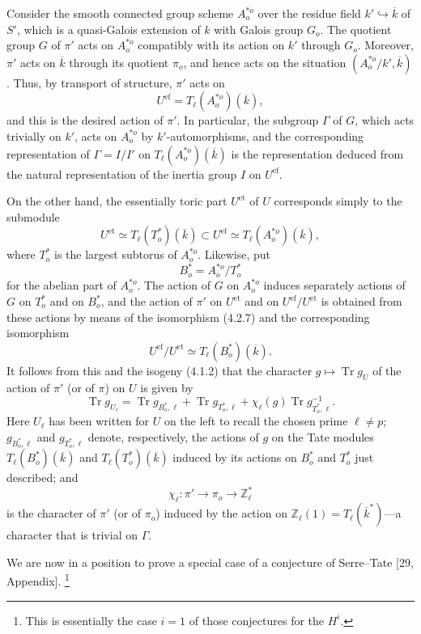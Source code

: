 Consider the smooth connected group scheme $A^{*o}_o$ over the residue
field $k'\hookrightarrow\overline k$ of $S'$, which is a quasi-Galois
extension of $k$ with Galois group $G_o$.  The quotient group $G$ of
$\pi'$ acts on $A^{*o}_o$ compatibly with its action on $k'$ through
$G_o$.  Moreover, $\pi'$ acts on $\overline k$ through its quotient
$\pi_o$, and hence acts on the situation
$(A^{*o}_o/k',\overline k)$.  Thus, by transport of structure, $\pi'$
acts on
\[
 U^{\mathrm{ef}}=T_\ell(A^{*o}_o)(\overline k),
\]
and this is the desired action of $\pi'$.  In particular, the subgroup
$\Gamma$ of $G$, which acts trivially on $k'$, acts on $A^{*o}_o$ by
$k'$-automorphisms, and the corresponding representation of
$\Gamma=I/I'$ on $T_\ell(A^{*o}_o)(\overline k)$ is the representation
deduced from the natural representation of the inertia group $I$ on
$U^{\mathrm{ef}}$.

On the other hand, the essentially toric part $U^{\mathrm{et}}$ of $U$
corresponds simply to the submodule
\begin{equation}\tag{4.2.7}
 U^{\mathrm{et}}\simeq T_\ell(T^*_o)(\overline k)
 \subset U^{\mathrm{ef}}\simeq T_\ell(A^{*o}_o)(\overline k),
\end{equation}
where $T^*_o$ is the largest subtorus of $A^{*o}_o$.  Likewise, put
\begin{equation}\tag{4.2.8}
 B^*_o=A^{*o}_o/T^*_o
\end{equation}
for the abelian part of $A^{*o}_o$.  The action of $G$ on $A^{*o}_o$
induces separately actions of $G$ on $T^*_o$ and on $B^*_o$, and the
action of $\pi'$ on $U^{\mathrm{et}}$ and on
$U^{\mathrm{ef}}/U^{\mathrm{et}}$ is obtained from these actions by
means of the isomorphism (4.2.7) and the corresponding isomorphism
\begin{equation}\tag{4.2.9}
 U^{\mathrm{ef}}/U^{\mathrm{et}}
 \simeq T_\ell(B^*_o)(\overline k).
\end{equation}
It follows from this and the isogeny (4.1.2) that the character
$g\longmapsto\operatorname{Tr}g_U$ of the action of $\pi'$ (or of
$\pi$) on $U$ is given by
\begin{equation}\tag{4.2.10}
 \operatorname{Tr}g_{U_\ell}
 =\operatorname{Tr}g_{B^*_o,\ell}
 +\operatorname{Tr}g_{T^*_o,\ell}
 +\chi_\ell(g)\operatorname{Tr}g^{-1}_{T^*_o,\ell}.
\end{equation}
Here $U_\ell$ has been written for $U$ on the left to recall the chosen
prime $\ell\ne p$; $g_{B^*_o,\ell}$ and $g_{T^*_o,\ell}$ denote,
respectively, the actions of $g$ on the Tate modules
$T_\ell(B^*_o)(\overline k)$ and $T_\ell(T^*_o)(\overline k)$ induced by
its actions on $B^*_o$ and $T^*_o$ just described; and
\begin{equation}\tag{4.2.11}
 \chi_\ell:\pi'\longrightarrow\pi_o\longrightarrow\mathbb Z_\ell^*
\end{equation}
is the character of $\pi'$ (or of $\pi_o$) induced by the action on
$\mathbb Z_\ell(1)=T_\ell(\overline k^*)$---a character that is trivial
on $\Gamma$.

We are now in a position to prove a special case of a conjecture of
Serre--Tate [29, Appendix].
\footnote{This is essentially the case $i=1$ of those conjectures for
the $H^i$.}
